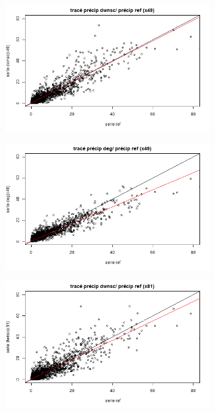 \documentclass[a4paper,11pt]{article}
\numberwithin{equation}{section}
\begin{document}
\begin{figure}[H]
	
	\centering
	\begin{subfigure}[b]{0.45\textwidth}
		\includegraphics[scale=0.35]{images/pr_3_CDFt_ref.png}
	\end{subfigure}
	\hfill
	\begin{subfigure}[b]{0.45\textwidth}
		\includegraphics[scale=0.35]{images/pr_3_dg.png}
	\end{subfigure}
	\begin{subfigure}[b]{0.45\textwidth}
		\includegraphics[scale=0.35]{images/pr_4_CDFt_ref.png}

\end{subfigure}
\end{figure}
\end{document}
